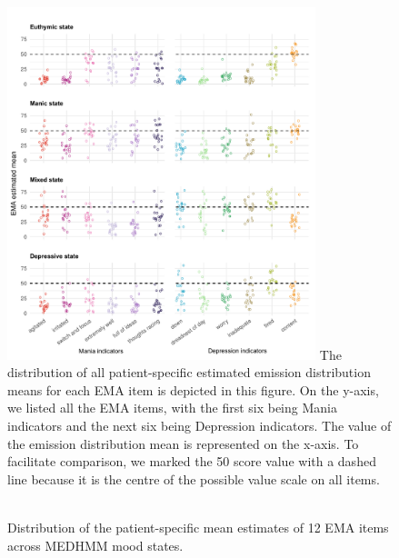 \begin{figure}
\caption{\\ Distribution of the patient-specific mean estimates of 12 EMA items across MEDHMM mood states.}
 \centering
 \includegraphics[width=0.8\textwidth]{graphics/ss_emiss.pdf}
  \flushleft
 \footnotesize
 \justifying
 The distribution of all patient-specific estimated emission distribution means for each EMA item is depicted in this figure. On the y-axis, we listed all the EMA items, with the first six being Mania indicators and the next six being Depression indicators. The value of the emission distribution mean is represented on the x-axis. To facilitate comparison, we marked the 50 score value with a dashed line because it is the centre of the possible value scale on all items.
 \label{fig:emiss_ss}
\end{figure}

